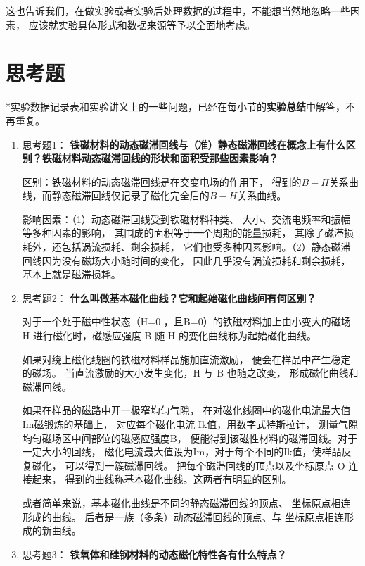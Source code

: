 \documentclass[11pt]{article}
\begin{document}
这也告诉我们，在做实验或者实验后处理数据的过程中，不能想当然地忽略一些因素，
应该就实验具体形式和数据来源等予以全面地考虑。

\newpage
\section{思考题}
*实验数据记录表和实验讲义上的一些问题，已经在每小节的{\bf 实验总结}中解答，不再重复。

\begin{enumerate}

    \item 思考题1：  \textbf{铁磁材料的动态磁滞回线与（准）静态磁滞回线在概念上有什么区别？铁磁材料动态磁滞回线的形状和面积受那些因素影响？}

区别：铁磁材料的动态磁滞回线是在交变电场的作用下，
得到的$B-H$关系曲线，而静态磁滞回线仅记录了磁化完全后的$B-H$关系曲线。

影响因素：（1）动态磁滞回线受到铁磁材料种类、
大小、交流电频率和振幅等多种因素的影响，
其围成的面积等于一个周期的能量损耗，
其除了磁滞损耗外，还包括涡流损耗、剩余损耗，
它们也受多种因素影响。（2）静态磁滞回线因为没有磁场大小随时间的变化，
因此几乎没有涡流损耗和剩余损耗，基本上就是磁滞损耗。

    \item 思考题2：  \textbf{什么叫做基本磁化曲线？它和起始磁化曲线间有何区别？}

    对于一个处于磁中性状态（H=0 ，且B=0）的铁磁材料加上由小变大的磁场
     H 进行磁化时，磁感应强度 B 随 H 的变化曲线称为起始磁化曲线。
     
     如果对绕上磁化线圈的铁磁材料样品施加直流激励，
     便会在样品中产生稳定的磁场。
     当直流激励的大小发生变化，H 与 B 也随之改变，
     形成磁化曲线和磁滞回线。
     
     如果在样品的磁路中开一极窄均匀气隙，
     在对磁化线圈中的磁化电流最大值Im磁锻炼的基础上，
     对应每个磁化电流 Ik值，用数字式特斯拉计，
     测量气隙均匀磁场区中间部位的磁感应强度B，
     便能得到该磁性材料的磁滞回线。对于一定大小的回线，
     磁化电流最大值设为Im，对于每个不同的Ik值，使样品反复磁化，
     可以得到一簇磁滞回线。
     把每个磁滞回线的顶点以及坐标原点 O 连接起来，
     得到的曲线称基本磁化曲线。这两者有明显的区别。

    或者简单来说，基本磁化曲线是不同的静态磁滞回线的顶点、
坐标原点相连形成的曲线。
后者是一族（多条）动态磁滞回线的顶点、与
坐标原点相连形成的新曲线。

    \item 思考题3：  \textbf{铁氧体和硅钢材料的动态磁化特性各有什么特点？}


\end{enumerate}
\end{document}
